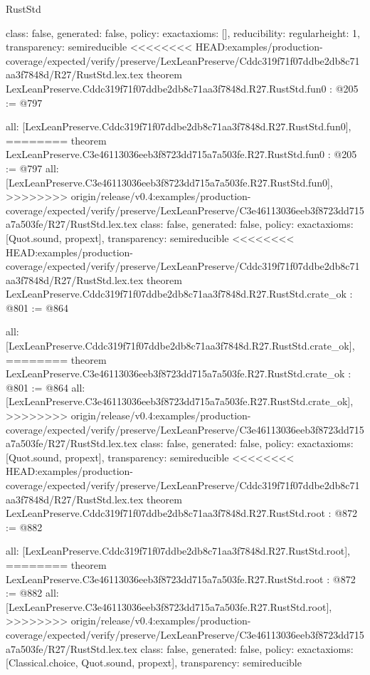\begin{lexlean}{RustStd}
\begin{coremodule}
{\begin{coremodule}
{{{  class: false,
  generated: false,
  policy: exact{axioms: []},
  reducibility: regular{height: 1},
  transparency: semireducible
}
<<<<<<<< HEAD:examples/production-coverage/expected/verify/preserve/LexLeanPreserve/Cddc319f71f07ddbe2db8c71aa3f7848d/R27/RustStd.lex.tex
theorem LexLeanPreserve.Cddc319f71f07ddbe2db8c71aa3f7848d.R27.RustStd.fun0 : @205 := @797 {
  all: [LexLeanPreserve.Cddc319f71f07ddbe2db8c71aa3f7848d.R27.RustStd.fun0],
========
theorem LexLeanPreserve.C3e46113036eeb3f8723dd715a7a503fe.R27.RustStd.fun0 : @205 := @797 {
  all: [LexLeanPreserve.C3e46113036eeb3f8723dd715a7a503fe.R27.RustStd.fun0],
>>>>>>>> origin/release/v0.4:examples/production-coverage/expected/verify/preserve/LexLeanPreserve/C3e46113036eeb3f8723dd715a7a503fe/R27/RustStd.lex.tex
  class: false,
  generated: false,
  policy: exact{axioms: [Quot.sound, propext]},
  transparency: semireducible
}
<<<<<<<< HEAD:examples/production-coverage/expected/verify/preserve/LexLeanPreserve/Cddc319f71f07ddbe2db8c71aa3f7848d/R27/RustStd.lex.tex
theorem LexLeanPreserve.Cddc319f71f07ddbe2db8c71aa3f7848d.R27.RustStd.crate_ok : @801 := @864 {
  all: [LexLeanPreserve.Cddc319f71f07ddbe2db8c71aa3f7848d.R27.RustStd.crate_ok],
========
theorem LexLeanPreserve.C3e46113036eeb3f8723dd715a7a503fe.R27.RustStd.crate_ok : @801 := @864 {
  all: [LexLeanPreserve.C3e46113036eeb3f8723dd715a7a503fe.R27.RustStd.crate_ok],
>>>>>>>> origin/release/v0.4:examples/production-coverage/expected/verify/preserve/LexLeanPreserve/C3e46113036eeb3f8723dd715a7a503fe/R27/RustStd.lex.tex
  class: false,
  generated: false,
  policy: exact{axioms: [Quot.sound, propext]},
  transparency: semireducible
}
<<<<<<<< HEAD:examples/production-coverage/expected/verify/preserve/LexLeanPreserve/Cddc319f71f07ddbe2db8c71aa3f7848d/R27/RustStd.lex.tex
theorem LexLeanPreserve.Cddc319f71f07ddbe2db8c71aa3f7848d.R27.RustStd.root : @872 := @882 {
  all: [LexLeanPreserve.Cddc319f71f07ddbe2db8c71aa3f7848d.R27.RustStd.root],
========
theorem LexLeanPreserve.C3e46113036eeb3f8723dd715a7a503fe.R27.RustStd.root : @872 := @882 {
  all: [LexLeanPreserve.C3e46113036eeb3f8723dd715a7a503fe.R27.RustStd.root],
>>>>>>>> origin/release/v0.4:examples/production-coverage/expected/verify/preserve/LexLeanPreserve/C3e46113036eeb3f8723dd715a7a503fe/R27/RustStd.lex.tex
  class: false,
  generated: false,
  policy: exact{axioms: [Classical.choice, Quot.sound, propext]},
  transparency: semireducible
}

}}}}}
\end{coremodule}}
\end{coremodule}
\end{lexlean}
